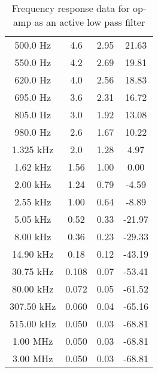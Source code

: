 \begin{table}[H]
\begin{tabular}{|c|c|c|c|}
        500.0 Hz     &  4.6   & 2.95 &  21.63 \\
        550.0 Hz     &  4.2   & 2.69 &  19.81 \\
        620.0 Hz     &  4.0    & 2.56 &  18.83 \\
        695.0 Hz     &  3.6   & 2.31 &  16.72 \\
        805.0 Hz     &  3.0     & 1.92 &  13.08 \\
        980.0 Hz     &  2.6   & 1.67 &  10.22 \\
        1.325 kHz    &  2.0     & 1.28 &   4.97 \\
        1.62 kHz    &  1.56  & 1.00    &   0.00    \\
        2.00 kHz    &  1.24  & 0.79 &  -4.59 \\
        2.55 kHz    &  1.00     & 0.64 &  -8.89 \\
        5.05 kHz    &  0.52  & 0.33 & -21.97 \\
        8.00 kHz    &  0.36  & 0.23 & -29.33 \\
        14.90 kHz   &  0.18  & 0.12 & -43.19 \\
        30.75 kHz   &  0.108 & 0.07 & -53.41 \\
        80.00 kHz   &  0.072 & 0.05 & -61.52 \\
        307.50 kHz  &  0.060 & 0.04 & -65.16 \\
        515.00 kHz  &  0.050 & 0.03 & -68.81 \\
        1.00 MHz &  0.050  & 0.03 & -68.81 \\
        3.00 MHz &  0.050  & 0.03 & -68.81 \\
        \hline
        \end{tabular}    
        \caption{Frequency response data for op-amp as an active low pass filter}
        \label{tab:1}
\end{table}